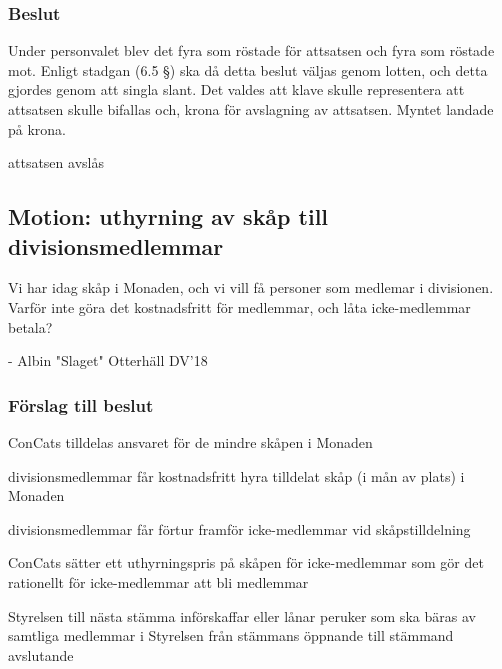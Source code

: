 \documentclass[protokoll]{dvd}
\begin{document}
\subsubsection*{Beslut}
Under personvalet blev det fyra som röstade för attsatsen och fyra som röstade mot. 
Enligt stadgan (6.5 §) ska då detta beslut väljas genom lotten, och detta gjordes genom att singla slant.
Det valdes att klave skulle representera att attsatsen skulle bifallas och, krona för avslagning av attsatsen.
Myntet landade på krona.
\begin{attsatser}
    \item attsatsen avslås
\end{attsatser}

\subsection{Motion: uthyrning av skåp till divisionsmedlemmar}

Vi har idag skåp i Monaden, och vi vill få personer som medlemar i divisionen. 
Varför inte göra det kostnadsfritt för medlemmar, och låta icke-medlemmar betala?

- Albin "Slaget" Otterhäll DV'18

\subsubsection*{Förslag till beslut}
\begin{attsatser}
	\item ConCats tilldelas ansvaret för de mindre skåpen i Monaden
	\item divisionsmedlemmar får kostnadsfritt hyra tilldelat skåp (i mån av plats) i Monaden
	\item divisionsmedlemmar får förtur framför icke-medlemmar vid skåpstilldelning
	\item ConCats sätter ett uthyrningspris på skåpen för icke-medlemmar som gör det rationellt för icke-medlemmar att bli medlemmar
	\item Styrelsen till nästa stämma införskaffar eller lånar peruker som ska bäras av samtliga medlemmar i Styrelsen från stämmans öppnande till stämmand avslutande
\end{attsatser}
\end{document}
